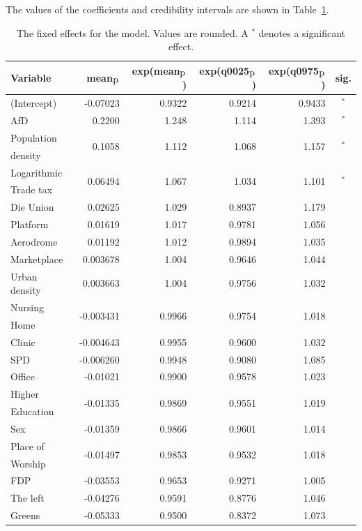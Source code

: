 The values of the coefficients and credibility intervals are shown in Table~\ref{FixedAllGermany_spatial}.
\begin{table}[H]
\caption{The fixed effects for the model. Values are rounded. A $^*$ denotes a significant effect. \label{FixedAllGermany_spatial}}
\begin{tabular}{l r r r r c}
\toprule
\textbf{Variable}	& \textbf{mean$_{\hbox{p}}$}	& \textbf{exp(mean$_{\hbox{p}}$)} & \textbf{exp(q0025$_{\hbox{p}}$)} & \textbf{exp(q0975$_{\hbox{p}}$)} & \textbf{sig.}\\
\midrule
(Intercept) & -0.07023 & 0.9322 & 0.9214 & 0.9433 & $^*$\\
AfD & 0.2200 & 1.248 & 1.114 & 1.393 & $^*$\\
Population & \multirow{2}{*}{0.1058} & \multirow{2}{*}{1.112} & \multirow{2}{*}{1.068} & \multirow{2}{*}{1.157} & \multirow{2}{*}{$^*$}\\
density \\
Logarithmic & \multirow{2}{*}{0.06494} & \multirow{2}{*}{1.067} & \multirow{2}{*}{1.034} & \multirow{2}{*}{1.101} & \multirow{2}{*}{$^*$}\\
Trade tax \\
Die Union & 0.02625 & 1.029 & 0.8937 & 1.179\\
Platform & 0.01619 & 1.017 & 0.9781 & 1.056 \\
Aerodrome & 0.01192 & 1.012 & 0.9894 & 1.035 \\
Marketplace & 0.003678 & 1.004 & 0.9646 & 1.044 \\
Urban density & 0.003663 & 1.004 & 0.9756 & 1.032 \\
Nursing& \multirow{2}{*}{-0.003431} & \multirow{2}{*}{0.9966} & \multirow{2}{*}{0.9754} & \multirow{2}{*}{1.018} \\
Home\\
Clinic & -0.004643 & 0.9955 & 0.9600 & 1.032 \\
SPD & -0.006260 & 0.9948 & 0.9080 & 1.085\\
Office & -0.01021 & 0.9900 & 0.9578 & 1.023 \\
Higher & \multirow{2}{*}{-0.01335} & \multirow{2}{*}{0.9869} & \multirow{2}{*}{0.9551} & \multirow{2}{*}{1.019} \\
Education\\
Sex & -0.01359 & 0.9866 & 0.9601 & 1.014 & \\
Place of & \multirow{2}{*}{-0.01497} & \multirow{2}{*}{0.9853} & \multirow{2}{*}{0.9532} & \multirow{2}{*}{1.018} \\
Worship\\
FDP & -0.03553 & 0.9653 & 0.9271& 1.005 \\
The left & -0.04276 & 0.9591 & 0.8776 & 1.046\\
Greens & -0.05333 & 0.9500 & 0.8372 & 1.073 \\
\bottomrule
\end{tabular}
\end{table}
